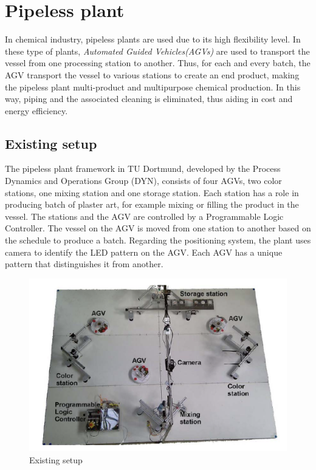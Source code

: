 \section{Pipeless plant} %

In chemical industry, pipeless plants are used due to its high flexibility level. In these type of plants, \textit{Automated Guided Vehicles(AGVs)} are used to transport the vessel from one processing station to another. Thus, for each and every batch, the AGV transport the vessel to various stations to create an end product, making the pipeless plant multi-product and multipurpose chemical production. In this way, piping and the associated cleaning is eliminated, thus aiding in cost and energy efficiency.

\subsection{Existing setup}
 
 The pipeless plant framework in TU Dortmund, developed by the Process Dynamics and Operations Group (DYN), consists of four AGVs, two color stations, one mixing station and one storage station. Each station has a role in producing batch of plaster art, for example mixing or filling the product in the vessel. The stations and the AGV are controlled by a Programmable Logic Controller. The vessel on the AGV is moved from one station to another based on the schedule to produce a batch. Regarding the positioning system, the plant uses camera to identify the LED pattern on the AGV. Each AGV has a unique pattern that distinguishes it from another.


\begin{figure}[!htbp]
	\centering
	\includegraphics[width=14cm]{Pictures/Plant.png}
	\caption{Existing setup}
	\label{Pipeless plant}
\end{figure}


